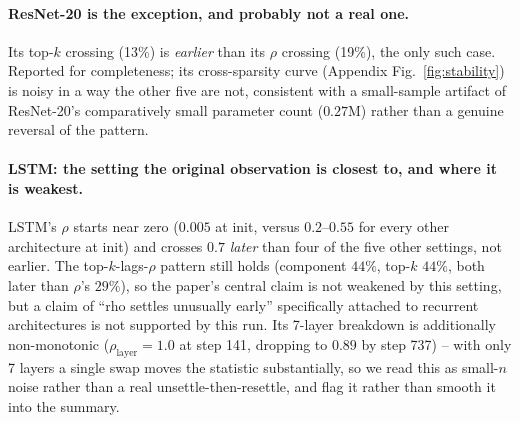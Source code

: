\documentclass{article}
\begin{document}
\paragraph{ResNet-20 is the exception, and probably not a real one.}
Its top-$k$ crossing (13\%) is \emph{earlier} than its $\rho$ crossing (19\%), the only
such case. Reported for completeness; its cross-sparsity curve (Appendix
Fig.~\ref{fig:stability}) is noisy in a way the other five are not, consistent with a
small-sample artifact of ResNet-20's comparatively small parameter count ($0.27$M) rather
than a genuine reversal of the pattern. %

\paragraph{LSTM: the setting the original observation is closest to, and where it is
weakest.} %
LSTM's $\rho$ starts near zero ($0.005$ at init, versus $0.2$--$0.55$ for every other
architecture at init) and crosses $0.7$ \emph{later} than four of the five other settings,
not earlier. The top-$k$-lags-$\rho$ pattern still holds (component $44\%$, top-$k$ $44\%$,
both later than $\rho$'s $29\%$), so the paper's central claim is not weakened by this
setting, but a claim of ``rho settles unusually early'' specifically attached to recurrent
architectures is not supported by this run. Its 7-layer breakdown is additionally
non-monotonic ($\rho_{\text{layer}}=1.0$ at step 141, dropping to $0.89$ by step 737) --
with only 7 layers a single swap moves the statistic substantially, so we read this as
small-$n$ noise rather than a real unsettle-then-resettle, and flag it rather than smooth
it into the summary.
\end{document}
